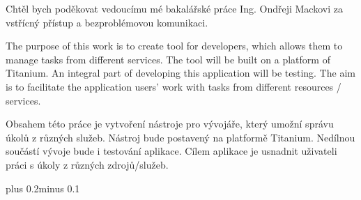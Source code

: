 \documentclass[11pt,twoside,a4paper]{book}
\begin{document}

\coverpagestarts


\acknowledgements
\noindent
Chtěl bych poděkovat vedoucímu mé bakalářské práce Ing. Ondřeji Mackovi za vstřícný přístup a bezproblémovou komunikaci.



 
\abstractpage
The purpose of this work is to create tool for developers, which allows them to manage tasks from different services. The tool will be built on a platform of Titanium. An integral part of developing this application will be testing. The aim is to facilitate the application users' work with tasks from different resources / services.


\baselineskip

\noindent
Obsahem této práce je vytvoření nástroje pro vývojáře, který umožní správu úkolů z různých služeb. Nástroj bude postavený na platformě Titanium. Nedílnou součástí vývoje bude i testování aplikace. Cílem aplikace je usnadnit uživateli práci s úkoly z různých zdrojů/služeb.


\tableofcontents



\listoffigures



\listoftables



\mainbodystarts
\normalfont
{}\baselineskip plus 0.2\baselineskip minus 0.1\baselineskip



\end{document}
